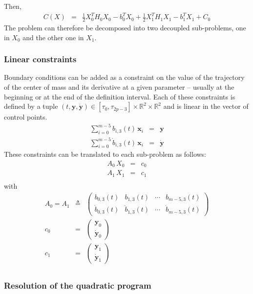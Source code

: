 \documentclass {article}
\newcommand\real{\mathbb{R}}
\newcommand\x{\mathbf{x}}
\newcommand\y{\mathbf{y}}
\newcommand\dy{\dot{\mathbf{y}}}
\begin{document}
Then,
\begin{eqnarray*}
C(X) &=& \frac{1}{2}X_0^TH_0X_0 - b_0^T X_0 + \frac{1}{2}X_1^TH_1X_1 - b_1^T X_1 + C_0
\end{eqnarray*}
The problem can therefore be decomposed into two decoupled sub-problems, one in $X_0$ and the other one in $X_1$.

\subsubsection {Linear constraints}

Boundary conditions can be added as a constraint on the value of the
trajectory of the center of mass and its derivative at a given
parameter -- usually at the beginning or at the end of the definition
interval. Each of these constraints is defined by a tuple
$(t,\y,\dy)\in[\tau_0,\tau_{2p-3}]\times\real^2\times\real^2$ and is
  linear in the vector of control points.
\begin{eqnarray}\label{eq:constraint}
\sum_{i=0}^{m-5}b_{i,3}(t)\,\x_i &=&\y \\
\sum_{i=0}^{m-5}\dot{b}_{i,3}(t)\,\x_i &=& \dy
\end{eqnarray}
These constraints can be translated to each sub-problem as follows:
\begin{eqnarray*}
  A_0\,X_0 &=& c_0 \\
  A_1\,X_1 &=& c_1 \\
\end{eqnarray*}
with
\begin{eqnarray*}
  A_0 = A_1 &\triangleq& \left(\begin{array}{cccc}b_{0,3}(t)&b_{1,3}(t)&\cdots&b_{m-5,3}(t)\\
    \dot{b}_{0,3}(t)&\dot{b}_{1,3}(t)&\cdots&\dot{b}_{m-5,3}(t)\end{array}\right) \\
  c_0 &=& \left(\begin{array}{c}\y_0\\\dy_0\end{array}\right) \\
  c_1 &=& \left(\begin{array}{c}\y_1\\\dy_1\end{array}\right) \\
\end{eqnarray*}

\subsubsection {Resolution of the quadratic program}
\end{document}
